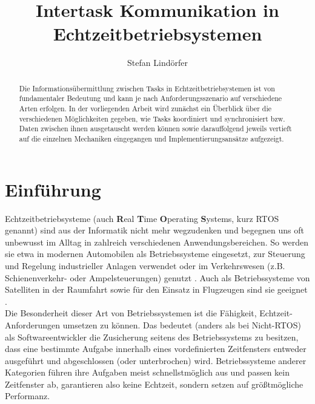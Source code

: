 \documentclass{llncs}
\begin{document}
\title{Intertask Kommunikation in Echtzeitbetriebsystemen}
\author{Stefan Lindörfer\\
}


\maketitle

\renewcommand{\abstractname}{Abstract}

\begin{abstract}
	Die Informationsübermittlung zwischen Tasks in Echtzeitbetriebsystemen ist von fundamentaler Bedeutung und kann je nach Anforderungsszenario auf verschiedene Arten erfolgen. In der vorliegenden Arbeit wird zunächst ein Überblick über die verschiedenen Möglichkeiten gegeben, wie Tasks koordiniert und synchronisiert bzw. Daten zwischen ihnen ausgetauscht werden können sowie darauffolgend jeweils vertieft auf die einzelnen Mechaniken eingegangen und Implementierungsansätze aufgezeigt.
\end{abstract}

\section{Einführung}
\label{subsec:Einführung}
Echtzeitbetriebsysteme (auch \textbf{R}eal \textbf{T}ime \textbf{O}perating \textbf{S}ystems, kurz RTOS genannt) sind aus der Informatik nicht mehr wegzudenken und begegnen uns oft unbewusst im Alltag in zahlreich verschiedenen Anwendungsbereichen. So werden sie etwa in modernen Automobilen als Betriebssysteme eingesetzt, zur Steuerung und Regelung industrieller Anlagen verwendet oder im Verkehrswesen (z.B. Schienenverkehr- oder Ampelsteuerungen) genutzt \autocite[vgl.][157]{Winzker2008}. Auch als Betriebssysteme von Satelliten in der Raumfahrt sowie für den Einsatz in Flugzeugen sind sie geeignet \autocite{Wuerzburg2019}.\\

Die Besonderheit dieser Art von Betriebssystemen ist die Fähigkeit, Echtzeit-Anforderungen umsetzen zu können. Das bedeutet (anders als bei Nicht-RTOS) als Softwareentwickler die Zusicherung seitens des Betriebssystems zu besitzen, dass eine bestimmte Aufgabe innerhalb eines vordefinierten Zeitfensters entweder ausgeführt und abgeschlossen (oder unterbrochen) wird. Betriebssysteme anderer Kategorien führen ihre Aufgaben meist schnellstmöglich aus und passen kein Zeitfenster ab, garantieren also keine Echtzeit, sondern setzen auf größtmögliche Performanz.\\
\end{document}
